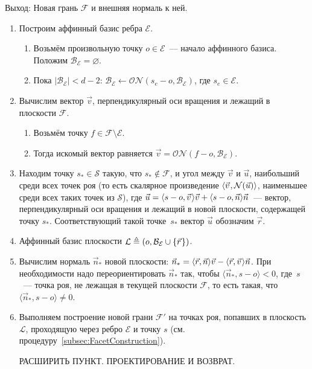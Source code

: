 \documentclass[a4paper,12pt]{article}
\newcommand{\Swarm}{\mathcal{S}}              %
\newcommand{\Facet}{\mathcal{F}}              %
\newcommand{\Edge}{\mathcal{E}}               %
\newcommand{\Basis}{\mathcal{B}}              %
\newcommand{\set}[2][]{#1\{ #2 #1\}}                    %
\newcommand{\scalprod}[3][]{#1\langle #2, #3 #1\rangle} %
\newcommand{\Norm}[2][]{\mathcal{N}#1( #2 #1)} %
\newcommand{\ONorm}[3][]{\mathcal{ON}#1( #2, #3 #1)} %
\newcommand{\Plane}{\mathcal{L}}           %
\renewcommand{\.}{\hspace{0.2ex}}
\begin{document}
    Выход: Новая грань $\Facet$ и внешняя нормаль к ней.

    \begin{enumerate}
      \item Построим аффинный базис ребра $\Edge$.
      \begin{enumerate}
        \item Возьмём произвольную точку $o \in \Edge$~--- начало аффинного базиса. Положим $\Basis_\Edge = \varnothing$.

        \item Пока $|\Basis_\Edge| < d-2$: $\Basis_\Edge \leftarrow \ONorm{s_e - o}{\Basis_\Edge}$, где $s_e \in \Edge$.
      \end{enumerate}

      \item Вычислим вектор $\vec v$, перпендикулярный оси вращения и лежащий в плоскости $\Facet$.
      \begin{enumerate}
        \item Возьмём точку $f \in \Facet \setminus \Edge$.
        \item Тогда искомый вектор равняется $\vec v = \ONorm{f - o}{\Basis_\Edge}$.
      \end{enumerate}

      \item Находим точку $s_* \in \Swarm$ такую, что $s_* \notin \Facet$, и угол между $\vec v$ и $\vec u$, наибольший среди всех точек роя (то есть скалярное произведение $\scalprod{\vec v \.}{\Norm{\vec u}}$, наименьшее среди всех таких точек из $\Swarm$), где $\vec u = \scalprod{s - o}{\vec v \.}\vec v + \scalprod{s - o}{\vec n}\vec n$~--- вектор, перпендикулярный оси вращения и лежащий в новой плоскости, содержащей точку $s_*$. Соответствующий такой точке~$s_*$ вектор $\vec u$ обозначим $\vec r$.

      \item Аффинный базис плоскости $\Plane \triangleq (o, \Basis_\Edge \cup \set{\vec r \.})$.

      \item Вычислим нормаль $\vec n_{*}$ новой плоскости: $\vec n_{*} = \scalprod{\vec r}{\vec n}\vec v - \scalprod{\vec r}{\vec v \.}\vec n$. При необходимости надо переориентировать $\vec n_{*}$ так, чтобы $\scalprod{\vec n_{*}}{s - o} < 0$, где~$s$~--- точка роя, не лежащая в текущей плоскости $\Facet$, то есть такая, что $\scalprod{\vec n_{*}}{s - o} \neq 0$.

      \item Выполняем построение новой грани $\Facet'$ на точках роя, попавших в плоскость $\Plane$, проходящую через ребро $\Edge$ и точку $s$ (см. процедуру~\ref{subsec:FacetConstruction}).

      РАСШИРИТЬ ПУНКТ. ПРОЕКТИРОВАНИЕ И ВОЗВРАТ.
    \end{enumerate}
\end{document}
